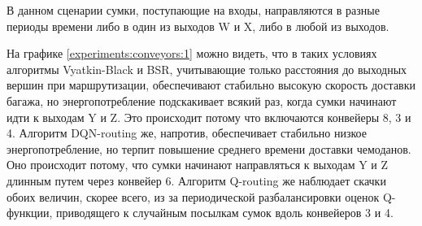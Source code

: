 \documentclass[specification,annotation,times]{itmo-student-thesis}
\theoremstyle{definition}
\begin{document}
В данном сценарии сумки, поступающие на входы, направляются в разные периоды
времени либо в один из выходов W и X, либо в любой из выходов.

На графике \ref{experiments:conveyors:1} можно видеть, что в таких условиях
алгоритмы Vyatkin-Black и BSR, учитывающие только расстояния до выходных вершин
при маршрутизации, обеспечивают стабильно высокую скорость доставки багажа, но
энергопотребление подскакивает всякий раз, когда сумки начинают идти к выходам Y
и Z. Это происходит потому что включаются конвейеры 8, 3 и 4. Алгоритм
DQN-routing же, напротив, обеспечивает стабильно низкое энергопотребление, но
терпит повышение среднего времени доставки чемоданов. Оно происходит потому, что
сумки начинают направляться к выходам Y и Z длинным путем через конвейер 6.
Алгоритм Q-routing же наблюдает скачки обоих величин, скорее всего, из за
периодической разбалансировки оценок Q-функции, приводящего к случайным посылкам
сумок вдоль конвейеров 3 и 4.





\end{document}
